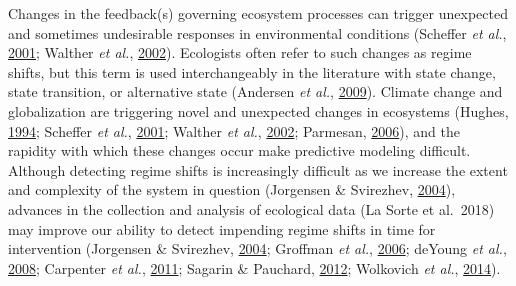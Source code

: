 \documentclass[12pt,twoside,openany]{reedthesis}
\begin{document}
Changes in the feedback(s) governing ecosystem processes can trigger unexpected and sometimes undesirable responses in environmental conditions (Scheffer \emph{et al.}, \protect\hyperlink{ref-scheffer_catastrophic_2001}{2001}; Walther \emph{et al.}, \protect\hyperlink{ref-walther_ecological_2002}{2002}). Ecologists often refer to such changes as regime shifts, but this term is used interchangeably in the literature with state change, state transition, or alternative state (Andersen \emph{et al.}, \protect\hyperlink{ref-andersen_ecological_2009}{2009}). Climate change and globalization are triggering novel and unexpected changes in ecosystems (Hughes, \protect\hyperlink{ref-hughes_catastrophes_1994}{1994}; Scheffer \emph{et al.}, \protect\hyperlink{ref-scheffer_catastrophic_2001}{2001}; Walther \emph{et al.}, \protect\hyperlink{ref-walther_ecological_2002}{2002}; Parmesan, \protect\hyperlink{ref-parmesan_ecological_2006}{2006}), and the rapidity with which these changes occur make predictive modeling difficult. Although detecting regime shifts is increasingly difficult as we increase the extent and complexity of the system in question (Jorgensen \& Svirezhev, \protect\hyperlink{ref-jorgensen_towards_2004}{2004}), advances in the collection and analysis of ecological data (La Sorte et al.~2018) may improve our ability to detect impending regime shifts in time for intervention (Jorgensen \& Svirezhev, \protect\hyperlink{ref-jorgensen_towards_2004}{2004}; Groffman \emph{et al.}, \protect\hyperlink{ref-groffman_ecological_2006}{2006}; deYoung \emph{et al.}, \protect\hyperlink{ref-deyoung_regime_2008}{2008}; Carpenter \emph{et al.}, \protect\hyperlink{ref-carpenter2011early}{2011}; Sagarin \& Pauchard, \protect\hyperlink{ref-sagarin_observation_2012}{2012}; Wolkovich \emph{et al.}, \protect\hyperlink{ref-wolkovich_temporal_2014}{2014}).
\end{document}
